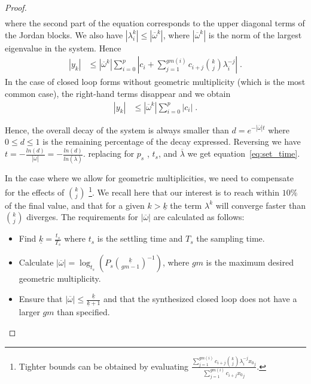 \documentclass[sigconf]{llncs}
\newcommand{\mat}[1]{{#1}}
\renewcommand{\vec}[1]{{#1}}
\begin{document}
\begin{proof}
\begin{align*}
\end{align*}
where the second  part of the equation corresponds to the upper diagonal
terms of the Jordan blocks.  We also have $|\lambda_i^k|\leq
|\overline{\omega}^k|$, where $|\overline{\omega}^k|$ is the norm of the largest
eigenvalue in the system. Hence
%
\begin{align*}
|y_k|&\leq |\overline{\omega}^k|\sum_{i=0}^p \left|c_i + \sum\limits_{j=1}^{gm(i)}c_{i+j}\binom{k}{j} \lambda_i^{-j}\right|\;.
\end{align*}
%
In the case of closed loop forms without geometric multiplicity (which is
the most common case), the right-hand terms disappear and we obtain
%
\begin{align*}
|y_k|&\leq |\overline{\omega}^k|\sum_{i=0}^p |c_i|\;.
\end{align*}

Hence, the overall decay of the system is always smaller than
$d=e^{-|\overline{\omega}| t}$ where $0\leq d\leq 1$ is the remaining
percentage of the decay expressed.  Reversing we have
$t=-\frac{ln(d)}{|\overline{\omega}|}=-\frac{ln(d)}{ln(\overline{\lambda})}$. 
replacing for $p_s$ , $t_s$, and $\overline{\lambda}$ we get
equation~\eqref{eq:set_time}.
%

In the case where we allow for geometric multiplicities, we need to
compensate for the effects of $\binom{k}{j}$ \footnote{Tighter bounds can be
obtained by evaluating $\frac{\sum\limits_{j=1}^{gm(i)}c_{i+j}\binom{k}{j}
\lambda_i^{-j}{\vec{x}_0}_j}{\sum\limits_{j=1}^{gm(i)}c_{i+j}{\vec{x}_0}_j}$.}. 
We recall here that our interest is to reach within $10\%$ of the final
value, and that for a given $k>\underline{k}$ the term $\lambda^k$ will
converge faster than $\binom{k}{j}$ diverges.  The requirements for
$|\overline{\omega}|$ are calculated as follows:
%
\begin{itemize}
%
\item Find $\underline{k}=\frac{t_s}{T_s}$ where $t_s$ is the settling time and $T_s$ the sampling time.
%
\item Calculate $|\overline{\omega}|=\log_{t_s}\left(P_s\binom{\underline{k}}{gm-1}^{-1}\right)$,
where $gm$ is the maximum desired geometric multiplicity.
%
\item Ensure that $|\overline{\omega}| \leq \frac{\underline{k}}{\underline{k}+1}$ and that the
synthesized closed loop does not have a larger $gm$ than specified.
%
\end{itemize}
\end{proof}
\end{document}
